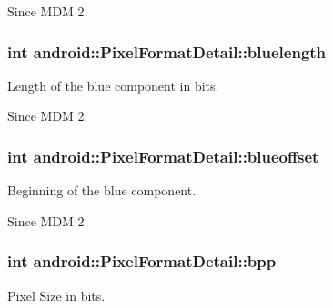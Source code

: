 \begin{DoxySince}{\-Since}
\-M\-D\-M 2. 
\end{DoxySince}
\hypertarget{structandroid_1_1PixelFormatDetail_a47a3d74c3aef2f6731aecf8f118b5d45}{
\subsubsection[{bluelength}]{\setlength{\rightskip}{0pt plus 5cm}int {\bf android\-::\-Pixel\-Format\-Detail\-::bluelength}}}\label{structandroid_1_1PixelFormatDetail_a47a3d74c3aef2f6731aecf8f118b5d45}


\-Length of the blue component in bits. 

\begin{DoxySince}{\-Since}
\-M\-D\-M 2. 
\end{DoxySince}
\hypertarget{structandroid_1_1PixelFormatDetail_a8891e972a1badbcb7413733d32ae792b}{
\subsubsection[{blueoffset}]{\setlength{\rightskip}{0pt plus 5cm}int {\bf android\-::\-Pixel\-Format\-Detail\-::blueoffset}}}\label{structandroid_1_1PixelFormatDetail_a8891e972a1badbcb7413733d32ae792b}


\-Beginning of the blue component. 

\begin{DoxySince}{\-Since}
\-M\-D\-M 2. 
\end{DoxySince}
\hypertarget{structandroid_1_1PixelFormatDetail_a9b48c71237b9edee68ff1d7733ced1c0}{
\subsubsection[{bpp}]{\setlength{\rightskip}{0pt plus 5cm}int {\bf android\-::\-Pixel\-Format\-Detail\-::bpp}}}\label{structandroid_1_1PixelFormatDetail_a9b48c71237b9edee68ff1d7733ced1c0}


\-Pixel \-Size in bits. 

